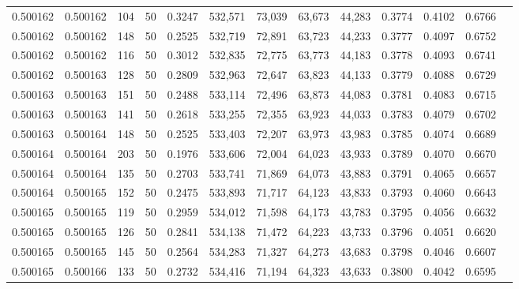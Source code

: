 \begin{tabular}{rrrrrrrrrrrrr}
0.500162 & 0.500162 &   104 &  50 &                                     0.3247 & 532,571 &  73,039 &  63,673 &  44,283 & 0.3774 & 0.4102 & 0.6766 \\
0.500162 & 0.500162 &   148 &  50 &                                     0.2525 & 532,719 &  72,891 &  63,723 &  44,233 & 0.3777 & 0.4097 & 0.6752 \\
0.500162 & 0.500162 &   116 &  50 &                                     0.3012 & 532,835 &  72,775 &  63,773 &  44,183 & 0.3778 & 0.4093 & 0.6741 \\
0.500162 & 0.500163 &   128 &  50 &                                     0.2809 & 532,963 &  72,647 &  63,823 &  44,133 & 0.3779 & 0.4088 & 0.6729 \\
0.500163 & 0.500163 &   151 &  50 &                                     0.2488 & 533,114 &  72,496 &  63,873 &  44,083 & 0.3781 & 0.4083 & 0.6715 \\
0.500163 & 0.500163 &   141 &  50 &                                     0.2618 & 533,255 &  72,355 &  63,923 &  44,033 & 0.3783 & 0.4079 & 0.6702 \\
0.500163 & 0.500164 &   148 &  50 &                                     0.2525 & 533,403 &  72,207 &  63,973 &  43,983 & 0.3785 & 0.4074 & 0.6689 \\
0.500164 & 0.500164 &   203 &  50 &                                     0.1976 & 533,606 &  72,004 &  64,023 &  43,933 & 0.3789 & 0.4070 & 0.6670 \\
0.500164 & 0.500164 &   135 &  50 &                                     0.2703 & 533,741 &  71,869 &  64,073 &  43,883 & 0.3791 & 0.4065 & 0.6657 \\
0.500164 & 0.500165 &   152 &  50 &                                     0.2475 & 533,893 &  71,717 &  64,123 &  43,833 & 0.3793 & 0.4060 & 0.6643 \\
0.500165 & 0.500165 &   119 &  50 &                                     0.2959 & 534,012 &  71,598 &  64,173 &  43,783 & 0.3795 & 0.4056 & 0.6632 \\
0.500165 & 0.500165 &   126 &  50 &                                     0.2841 & 534,138 &  71,472 &  64,223 &  43,733 & 0.3796 & 0.4051 & 0.6620 \\
0.500165 & 0.500165 &   145 &  50 &                                     0.2564 & 534,283 &  71,327 &  64,273 &  43,683 & 0.3798 & 0.4046 & 0.6607 \\
0.500165 & 0.500166 &   133 &  50 &                                     0.2732 & 534,416 &  71,194 &  64,323 &  43,633 & 0.3800 & 0.4042 & 0.6595 \\

\end{tabular}
